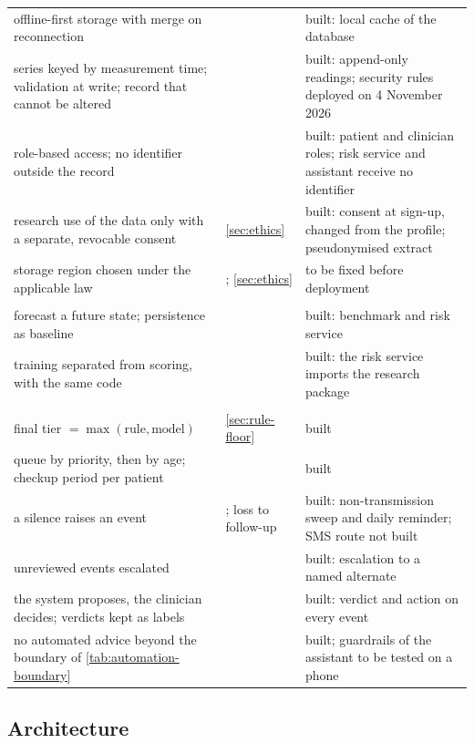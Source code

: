 \documentclass[11pt,a4paper,oneside]{report}
\begin{document}
{\begin{longtable}{@{}>{\raggedright\arraybackslash}p{4.9cm} >{\raggedright\arraybackslash}p{3.2cm} >{\raggedright\arraybackslash}p{5.5cm}@{}}
offline-first storage with merge on reconnection & \textcite{efendi2025} & built: local cache of the database \\
series keyed by measurement time; validation at write; record that cannot be altered & \textcite{liu2025review} & built: append-only readings; security rules deployed on 4 November 2026 \\
role-based access; no identifier outside the record & \textcite{alhammad2024} & built: patient and clinician roles; risk service and assistant receive no identifier \\
research use of the data only with a separate, revocable consent & \cref{sec:ethics} & built: consent at sign-up, changed from the profile; pseudonymised extract \\
storage region chosen under the applicable law & \textcite{alhammad2024}; \cref{sec:ethics} & to be fixed before deployment \\
\addlinespace
\multicolumn{3}{@{}l}{\textit{Modelling}} \\
forecast a future state; persistence as baseline & \textcite{efendi2025,mendoza2025} & built: benchmark and risk service \\
training separated from scoring, with the same code & \textcite{liu2025review} & built: the risk service imports the research package \\
\addlinespace
\multicolumn{3}{@{}l}{\textit{Decision support}} \\
final tier $= \max(\text{rule}, \text{model})$ & \cref{sec:rule-floor} & built \\
queue by priority, then by age; checkup period per patient & \textcite{yazdani2018} & built \\
a silence raises an event & \textcite{yazdani2018}; loss to follow-up & built: non-transmission sweep and daily reminder; SMS route not built \\
unreviewed events escalated & \textcite{mucchi2021} & built: escalation to a named alternate \\
the system proposes, the clinician decides; verdicts kept as labels & \textcite{yazdani2018,mihevc2025} & built: verdict and action on every event \\
no automated advice beyond the boundary of \cref{tab:automation-boundary} & \textcite{mihevc2025} & built; guardrails of the assistant to be tested on a phone \\
\bottomrule
\end{longtable}}

\subsection{Architecture}\label{sec:layers}
\end{document}
